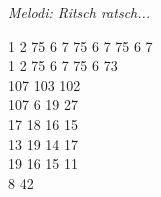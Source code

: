 {\footnotesize\textit{Melodi: Ritsch ratsch...}}\par
\vspace{10pt}
1 2 75 6 7 75 6 7 75 6 7\\
1 2 75 6 7 75 6 73\\
107 103 102\\
107 6 19 27\\
17 18 16 15\\
13 19 14 17\\
19 16 15 11\\
8 42
